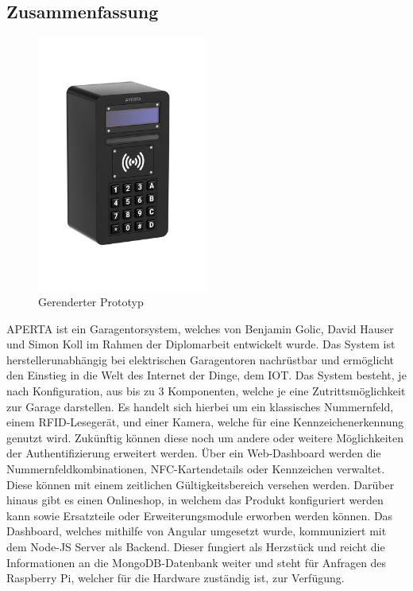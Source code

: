 \newpage
\begin{spacing}{1}
  \chapter*{Zusammenfassung}
\end{spacing}
\begin{figure}
  \begin{center}
    \includegraphics[width=0.5\textwidth]{pics/all-in-package.png}
    \caption{Gerenderter Prototyp}
  \end{center}
\end{figure}
APERTA ist ein Garagentorsystem, welches von Benjamin Golic, David Hauser und Simon Koll im Rahmen der Diplomarbeit entwickelt wurde. Das System ist herstellerunabhängig bei elektrischen Garagentoren nachrüstbar und ermöglicht den Einstieg in die Welt des Internet der Dinge, dem IOT. Das System besteht, je nach Konfiguration, aus bis zu 3 Komponenten, welche je eine Zutrittsmöglichkeit zur Garage darstellen. Es handelt sich hierbei um ein klassisches Nummernfeld, einem RFID-Lesegerät, und einer Kamera, welche für eine Kennzeichenerkennung genutzt wird. Zukünftig können diese noch um andere oder weitere Möglichkeiten der Authentifizierung erweitert werden. Über ein Web-Dashboard werden die Nummernfeldkombinationen, NFC-Kartendetails oder Kennzeichen verwaltet. Diese können mit einem zeitlichen Gültigkeitsbereich versehen werden. Darüber hinaus gibt es einen Onlineshop, in welchem das Produkt konfiguriert werden kann sowie Ersatzteile oder Erweiterungsmodule erworben werden können. Das Dashboard, welches mithilfe von Angular umgesetzt wurde, kommuniziert mit dem Node-JS Server als Backend. Dieser fungiert als Herzstück und reicht die Informationen an die MongoDB-Datenbank weiter und steht für Anfragen des Raspberry Pi, welcher für die Hardware zuständig ist, zur Verfügung.